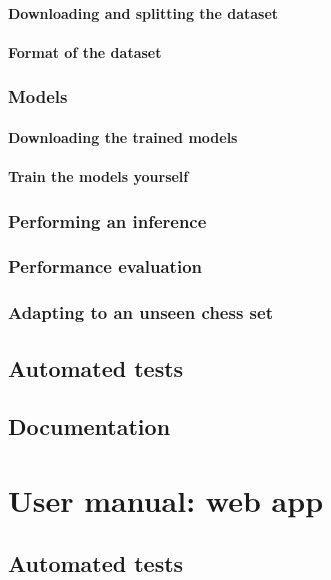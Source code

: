 \documentclass[../../report.tex]{subfiles}
\begin{document}
\subsubsection{Downloading and splitting the dataset}

\subsubsection{Format of the dataset}

\subsection{Models}
\subsubsection{Downloading the trained models}
\subsubsection{Train the models yourself}

\subsection{Performing an inference}

\subsection{Performance evaluation}

\subsection{Adapting to an unseen chess set}

\section{Automated tests}
\label{sec:chesscog_tests}

\section{Documentation}
\label{sec:chesscog_documentation}

\chapter{User manual: web app}
\label{chap:user_man_chesscogapp}

\section{Automated tests}
\label{sec:chesscogapp_tests}
\end{document}
